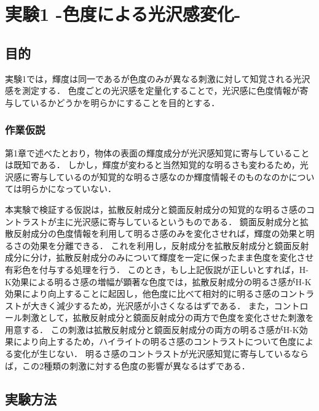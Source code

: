 \chapter{実験1 -色度による光沢感変化-}

    \section{目的}
        実験1では，輝度は同一であるが色度のみが異なる刺激に対して知覚される光沢感を測定する．
        色度ごとの光沢感を定量化することで，光沢感に色度情報が寄与しているかどうかを明らかにすることを目的とする．

        \subsection{作業仮説}
            第1章で述べたとおり，物体の表面の輝度成分が光沢感知覚に寄与していることは既知である．
            しかし，輝度が変わると当然知覚的な明るさも変わるため，光沢感に寄与しているのが知覚的な明るさ感なのか輝度情報そのものなのかについては明らかになっていない．

            本実験で検証する仮説は，拡散反射成分と鏡面反射成分の知覚的な明るさ感のコントラストが主に光沢感に寄与しているというものである．
            鏡面反射成分と拡散反射成分の色度情報を利用して明るさ感のみを変化させれば，輝度の効果と明るさの効果を分離できる．
            これを利用し，反射成分を拡散反射成分と鏡面反射成分に分け，拡散反射成分のみについて輝度を一定に保ったまま色度を変化させ有彩色を付与する処理を行う．
            このとき，もし上記仮説が正しいとすれば，H-K効果による明るさ感の増幅が顕著な色度では，拡散反射成分の明るさ感がH-K効果により向上することに起因し，他色度に比べて相対的に明るさ感のコントラストが大きく減少するため，光沢感が小さくなるはずである．
            また，コントロール刺激として，拡散反射成分と鏡面反射成分の両方で色度を変化させた刺激を用意する．
            この刺激は拡散反射成分と鏡面反射成分の両方の明るさ感がH-K効果により向上するため，ハイライトの明るさ感のコントラストについて色度による変化が生じない．
            明るさ感のコントラストが光沢感知覚に寄与しているならば，この2種類の刺激に対する色度の影響が異なるはずである．

    \section{実験方法}

